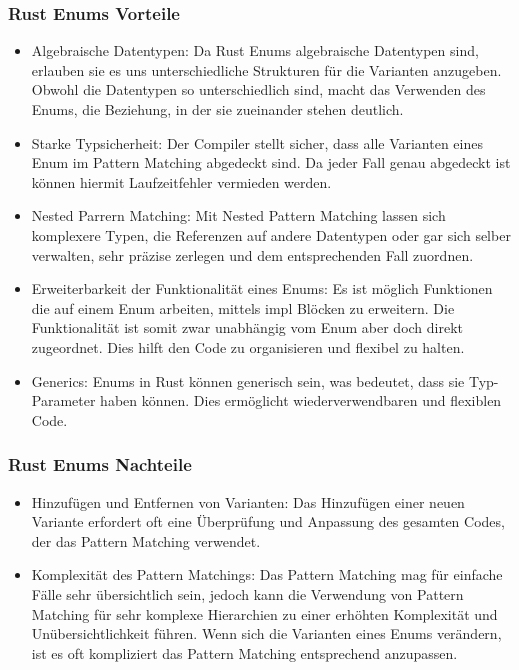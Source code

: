 \documentclass[a4paper, 1ppt]{article}
\begin{document}
\subsubsection{Rust Enums Vorteile}
\begin{itemize}
		\item Algebraische Datentypen: Da Rust Enums algebraische Datentypen sind, erlauben sie es uns unterschiedliche Strukturen für die Varianten anzugeben.
		Obwohl die Datentypen so unterschiedlich sind, macht das Verwenden des Enums, die Beziehung, in der sie zueinander stehen deutlich.
		\item Starke Typsicherheit: Der Compiler stellt sicher, dass alle Varianten eines Enum im Pattern Matching abgedeckt sind. 
		Da jeder Fall genau abgedeckt ist können hiermit Laufzeitfehler vermieden werden.
		\item Nested Parrern Matching: Mit Nested Pattern Matching lassen sich komplexere Typen, die Referenzen auf andere Datentypen oder gar sich selber verwalten, sehr präzise zerlegen und dem entsprechenden Fall zuordnen.
		\item Erweiterbarkeit der Funktionalität eines Enums: Es ist möglich Funktionen die auf einem Enum arbeiten, mittels impl Blöcken zu erweitern.
Die Funktionalität ist somit zwar unabhängig vom Enum aber doch direkt zugeordnet.
Dies hilft den Code zu organisieren und flexibel zu halten.
		\item Generics: Enums in Rust können generisch sein, was bedeutet, dass sie Typ-Parameter haben können. Dies ermöglicht wiederverwendbaren und flexiblen Code.
\end{itemize}
\subsubsection{Rust Enums Nachteile}
\begin{itemize}
	\item Hinzufügen und Entfernen von Varianten: Das Hinzufügen einer neuen Variante erfordert oft eine Überprüfung und Anpassung des gesamten Codes, der das Pattern Matching verwendet.
	\item Komplexität des Pattern Matchings: Das Pattern Matching mag für einfache Fälle sehr übersichtlich sein, jedoch
kann die Verwendung von Pattern Matching für sehr komplexe Hierarchien zu einer erhöhten Komplexität und Unübersichtlichkeit führen.
Wenn sich die Varianten eines Enums verändern, ist es oft kompliziert das Pattern Matching entsprechend anzupassen.
\end{itemize}
\end{document}
